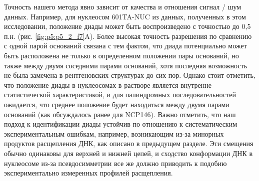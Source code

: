 Точность нашего метода явно зависит от качества и отношения сигнал / шум данных. Например, для нуклеосом 601TA-NUC из данных, полученных в этом исследовании, положение диады может быть воспроизведено с точностью до 0,5 п.н. (рис. \ref{fig:p5:p5_2_f7}A). Более высокая точность разрешения по сравнению с одной парой оснований связана с тем фактом, что диада потенциально может быть расположена не только в определенном положении пары оснований, но также между двумя соседними парами оснований, хотя последняя возможность не была замечена в рентгеновских структурах до сих пор. Однако стоит отметить, что положение диады в нуклеосомах в растворе является внутренне статистической характеристикой, и для палиндромных последовательностей ожидается, что среднее положение будет находиться между двумя парами оснований (как обсуждалось ранее для NCP146).
Важно отметить, что наш подход к идентификации диады устойчив по отношению к систематическим экспериментальным ошибкам, например, возникающим из-за минорных продуктов расщепления ДНК, как описано в предыдущем разделе. Эти смещения обычно одинаковы для верхней и нижней цепей, и сходство конформации ДНК в нуклеосоме из-за псевдосимметрии все же должно приводить к подобию экспериментально измеренных профилей расщепления.

